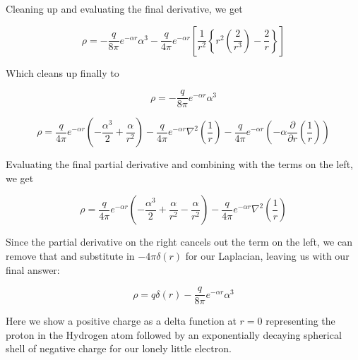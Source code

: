 Cleaning up and evaluating the final derivative, we get

\begin{equation}
  \rho
  = - \frac{q}{8\pi}
  e^{-\alpha r}
  \alpha^3
  -\frac{q}{4\pi}  
  e^{-\alpha r}
  \left[
  \frac{1}{r^2}
  \left\{
  r^2 (\frac{2}{r^3})
  - \frac{2}{r}
  \right\}
  \right]
\end{equation}

Which cleans up finally to

\begin{equation}
  \rho
  = - \frac{q}{8\pi}
  e^{-\alpha r}
  \alpha^3
\end{equation}








\begin{equation}
  \rho
  = \frac{q}{4\pi}
  e^{-\alpha r}
  \left(
  - \frac{\alpha^3}{2}
  + \frac{\alpha}{r^2}
  \right)
  -\frac{q}{4\pi}  
  e^{-\alpha r}
  \nabla^2 \left(\frac{1}{r}\right)
  -\frac{q}{4\pi}  
  e^{-\alpha r}
  \left(-\alpha \frac{\partial}{\partial r}\left(\frac{1}{r}\right) \right)
\end{equation}

Evaluating the final partial derivative and combining with the terms
on the left, we get

\begin{equation}
  \rho
  = \frac{q}{4\pi}
  e^{-\alpha r}
  \left(
  - \frac{\alpha^3}{2}
  + \frac{\alpha}{r^2}
  - \frac{\alpha}{r^2}
  \right)
  -\frac{q}{4\pi}  
  e^{-\alpha r}
  \nabla^2 \left(\frac{1}{r}\right)
\end{equation}

Since the partial derivative on the right cancels out the term on the
left, we can remove that and substitute in $-4\pi\delta(r)$ for our
Laplacian, leaving us with our final answer:

\begin{equation}
  \rho
  = q\delta(r)
  - \frac{q}{8\pi}
  e^{-\alpha r}
  \alpha^3
\end{equation}


Here we show a positive charge as a delta function at $r=0$
representing the proton in the Hydrogen atom followed by an
exponentially decaying spherical shell of negative charge for our
lonely little electron.

